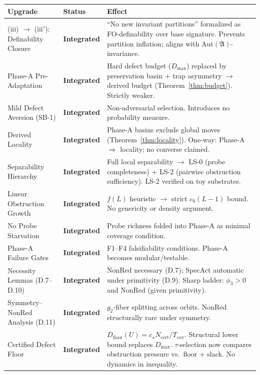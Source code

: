 \documentclass[11pt,a4paper]{article}
\theoremstyle{definition}
\theoremstyle{remark}
\begin{document}
\begin{center}\small
\begin{tabular}{p{4.5cm}p{2.5cm}p{6.5cm}}
\toprule
\textbf{Upgrade} & \textbf{Status} & \textbf{Effect} \\
\midrule
(iii) $\to$ (iii$'$): Definability Closure & \textbf{Integrated} & ``No new invariant partitions'' formalized as FO-definability over base signature. Prevents partition inflation; aligns with $\mathrm{Aut}(\mathfrak{A})$-invariance. \\
\addlinespace
Phase-A Pre-Adaptation & \textbf{Integrated} & Hard defect budget ($D_{\max}$) replaced by preservation basin + trap asymmetry $\to$ derived budget (Theorem~\ref{thm:budget}). Strictly weaker. \\
\addlinespace
Mild Defect Aversion (SB-1) & \textbf{Integrated} & Non-adversarial selection. Introduces no probability measure. \\
\addlinespace
Derived Locality & \textbf{Integrated} & Phase-A basins exclude global moves (Theorem~\ref{thm:locality}). One-way: Phase-A $\Rightarrow$ locality; no converse claimed. \\
\addlinespace
Separability Hierarchy & \textbf{Integrated} & Full local separability $\to$ LS-0 (probe completeness) + LS-2 (pairwise obstruction sufficiency). LS-2 verified on toy substrates. \\
\addlinespace
Linear Obstruction Growth & \textbf{Integrated} & $f(L)$ heuristic $\to$ strict $c_0(L-1)$ bound. No genericity or density argument. \\
\addlinespace
No Probe Starvation & \textbf{Integrated} & Probe richness folded into Phase-A as minimal coverage condition. \\
\addlinespace
Phase-A Failure Gates & \textbf{Integrated} & F1--F4 falsifiability conditions. Phase-A becomes modular/testable. \\
\addlinespace
Necessity Lemmas (D.7--D.10) & \textbf{Integrated} & NonRed necessary (D.7); SpecAct automatic under primitivity (D.9). Sharp ladder: $\phi_3 > 0$ and NonRed (given primitivity). \\
\addlinespace
Symmetry--NonRed Analysis (D.11) & \textbf{Integrated} & $g_2$-fiber splitting across orbits. NonRed structurally rare under symmetry. \\
\addlinespace
Certified Defect Floor & \textbf{Integrated} & $D_{\mathrm{floor}}(U) = c_\star N_{\mathrm{cert}}/T_{\mathrm{cov}}$. Structural lower bound replaces $D_{\max}$. $\tau$-selection now compares obstruction pressure vs.\ floor + slack. No dynamics in inequality. \\

\end{tabular}
\end{center}
\end{document}
